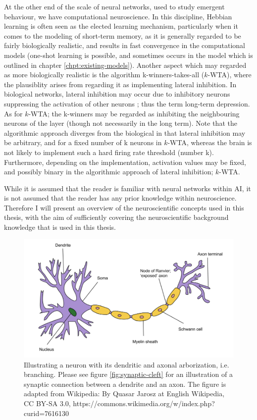 At the other end of the scale of neural networks, used to study emergent behaviour, we have computational neuroscience. In this discipline, Hebbian learning is often seen as the elected learning mechanism, particularly when it comes to the modeling of short-term memory, as it is generally regarded to be fairly biologically realistic, and results in fast convergence in the computational models (one-shot learning is possible, and sometimes occurs in the model which is outlined in chapter \ref{chpt:existing-models}). 
Another aspect which may regarded as more biologically realistic is the algorithm k-winners-takes-all ($k$-WTA), where the plausiblity arises from regarding it as implementing lateral inhibition. In biological networks, lateral inhibition may occur due to inhibitory neurons suppressing the activation of other neurons \citep{Rolls1998chpt1}; thus the term long-term depression. As for $k$-WTA; the k-winners may be regarded as inhibiting the neighbouring neurons of the layer (though not necessarily in the long term). Note that the algorithmic approach diverges from the biological in that lateral inhibition may be arbitrary, and for a fixed number of k neurons in $k$-WTA, whereas the brain is not likely to implement such a hard firing rate threshold (number k). Furthermore, depending on the implementation, activation values may be fixed, and possibly binary in the algorithmic approach of lateral inhibition; $k$-WTA.

While it is assumed that the reader is familiar with neural networks within AI, it is not assumed that the reader has any prior knowledge within neuroscience. Therefore I will present an overview of the neuroscientific concepts used in this thesis, with the aim of sufficiently covering the neuroscientific background knowledge that is used in this thesis.
\\

\begin{figure}
    \centering
    \includegraphics[width=12cm]{fig/neuron-figure-wikipedia}
    \caption{Illustrating a neuron with its dendritic and axonal arborization, i.e. branching. Please see figure \ref{fig:synaptic-cleft} for an illustration of a synaptic connection between a dendrite and an axon.
    The figure is adapted from Wikipedia: By Quasar Jarosz at English Wikipedia, CC BY-SA 3.0, https://commons.wikimedia.org/w/index.php?curid=7616130}
    \label{fig:neurons-synapses}
\end{figure}

